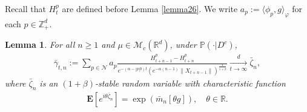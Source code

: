 \documentclass[12pt,a4paper]{amsart}
\theoremstyle{plain}
\newtheorem{lem}[thm]{Lemma}
\theoremstyle{definition}
\numberwithin{equation}{section}
\begin{document}
    Recall that $H^p_t$ are defined before Lemma \ref{lemma26}. We write $a_p:= \langle \phi_p, g\rangle_\varphi$ for each $p \in \mathbb Z_+^d$.

\begin{lem}\label{large-central}
    For all $n\ge 1$ and $\mu\in\mathcal{M}_c(\mathbb{R}^d)$, under $\mathbb{P}(\cdot|D^c)$,
\begin{align}
    \bar{\gamma}_{t,n}:=\sum_{p\in\mathcal{N}}a_p\frac{H^p_{t+n-1}-H^p_{t+n}}{e^{-(\alpha-|p|b)t}(e^{-\alpha(n-1)}\|X_{t+n-1}\|)^{\frac{1}{1+\beta}}}
    \xrightarrow[t\to \infty]{d}\bar{\zeta}_n,
\end{align}
    where $\bar{\zeta}_n$ is an $(1+\beta)$-stable random variable with characteristic function
\begin{align}
    \mathbf{E}[e^{i\theta \bar{\zeta}_n}]=\exp(\bar{m}_n[\theta g]),\quad \theta\in \mathbb{R}.
\end{align}
\end{lem}
\end{document}
